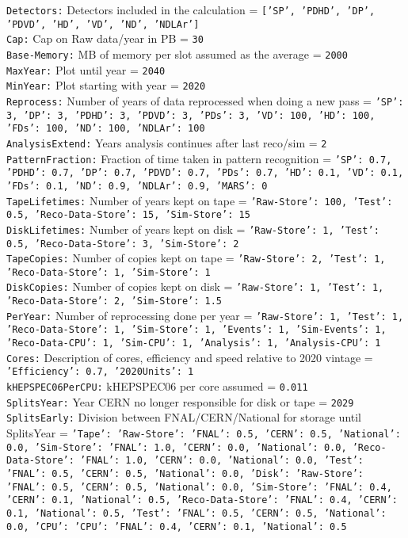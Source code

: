 {\tt Detectors:} Detectors included in the calculation = {\tt ['SP', 'PDHD', 'DP', 'PDVD', 'HD', 'VD', 'ND', 'NDLAr']} \\
{\tt Cap:} Cap on Raw data/year in PB = {\tt 30} \\
{\tt Base-Memory:} MB of memory per slot assumed as the average = {\tt 2000} \\
{\tt MaxYear:} Plot until year = {\tt 2040} \\
{\tt MinYear:} Plot starting with year = {\tt 2020} \\
{\tt Reprocess:} Number of years of data reprocessed when doing a new pass = {\tt {'SP': 3, 'DP': 3, 'PDHD': 3, 'PDVD': 3, 'PDs': 3, 'VD': 100, 'HD': 100, 'FDs': 100, 'ND': 100, 'NDLAr': 100}} \\
{\tt AnalysisExtend:} Years analysis continues after last reco/sim = {\tt 2} \\
{\tt PatternFraction:} Fraction of time taken in pattern recognition = {\tt {'SP': 0.7, 'PDHD': 0.7, 'DP': 0.7, 'PDVD': 0.7, 'PDs': 0.7, 'HD': 0.1, 'VD': 0.1, 'FDs': 0.1, 'ND': 0.9, 'NDLAr': 0.9, 'MARS': 0}} \\
{\tt TapeLifetimes:} Number of years kept on tape = {\tt {'Raw-Store': 100, 'Test': 0.5, 'Reco-Data-Store': 15, 'Sim-Store': 15}} \\
{\tt DiskLifetimes:} Number of years kept on disk = {\tt {'Raw-Store': 1, 'Test': 0.5, 'Reco-Data-Store': 3, 'Sim-Store': 2}} \\
{\tt TapeCopies:} Number of copies kept on tape = {\tt {'Raw-Store': 2, 'Test': 1, 'Reco-Data-Store': 1, 'Sim-Store': 1}} \\
{\tt DiskCopies:} Number of copies kept on disk = {\tt {'Raw-Store': 1, 'Test': 1, 'Reco-Data-Store': 2, 'Sim-Store': 1.5}} \\
{\tt PerYear:} Number of reprocessing done per year = {\tt {'Raw-Store': 1, 'Test': 1, 'Reco-Data-Store': 1, 'Sim-Store': 1, 'Events': 1, 'Sim-Events': 1, 'Reco-Data-CPU': 1, 'Sim-CPU': 1, 'Analysis': 1, 'Analysis-CPU': 1}} \\
{\tt Cores:} Description of cores, efficiency and speed relative to 2020 vintage = {\tt {'Efficiency': 0.7, '2020Units': 1}} \\
{\tt kHEPSPEC06PerCPU:} kHEPSPEC06 per core assumed = {\tt 0.011} \\
{\tt SplitsYear:} Year CERN no longer responsible for disk or tape = {\tt 2029} \\
{\tt SplitsEarly:} Division between FNAL/CERN/National for storage until SplitsYear = {\tt {'Tape': {'Raw-Store': {'FNAL': 0.5, 'CERN': 0.5, 'National': 0.0}, 'Sim-Store': {'FNAL': 1.0, 'CERN': 0.0, 'National': 0.0}, 'Reco-Data-Store': {'FNAL': 1.0, 'CERN': 0.0, 'National': 0.0}, 'Test': {'FNAL': 0.5, 'CERN': 0.5, 'National': 0.0}}, 'Disk': {'Raw-Store': {'FNAL': 0.5, 'CERN': 0.5, 'National': 0.0}, 'Sim-Store': {'FNAL': 0.4, 'CERN': 0.1, 'National': 0.5}, 'Reco-Data-Store': {'FNAL': 0.4, 'CERN': 0.1, 'National': 0.5}, 'Test': {'FNAL': 0.5, 'CERN': 0.5, 'National': 0.0}}, 'CPU': {'CPU': {'FNAL': 0.4, 'CERN': 0.1, 'National': 0.5}}}} \\
